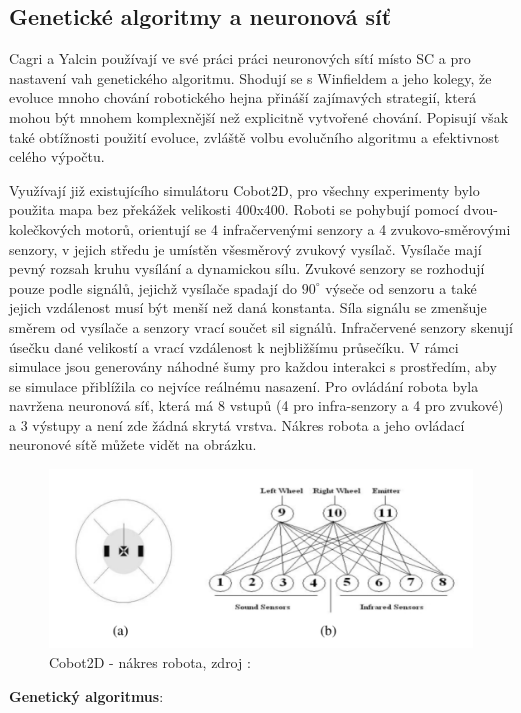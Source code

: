\subsection{Genetické algoritmy a neuronová síť}
Cagri a Yalcin používají ve své práci \citep{yalcin2008evolving} práci neuronových sítí místo SC a pro nastavení vah genetického algoritmu. Shodují se s Winfieldem a jeho kolegy, že evoluce mnoho chování robotického hejna přináší zajímavých strategií, která mohou být mnohem komplexnější než explicitně vytvořené chování. Popisují však také obtížnosti použití evoluce, zvláště volbu evolučního algoritmu a efektivnost celého výpočtu. 
\par
Využívají již existujícího simulátoru Cobot2D, pro všechny experimenty bylo použita mapa bez překážek velikosti 400x400. Roboti se pohybují pomocí dvou-kolečkových motorů, orientují se 4 infračervenými senzory a 4 zvukovo-směrovými senzory, v jejich středu je umístěn všesměrový zvukový vysílač. Vysílače mají pevný rozsah kruhu vysílání a dynamickou sílu. Zvukové senzory se rozhodují pouze podle signálů, jejichž vysílače spadají do $90^\circ$ výseče od senzoru a také jejich vzdálenost musí být menší než daná konstanta. Síla signálu se zmenšuje směrem od vysílače a senzory vrací součet sil signálů. Infračervené senzory skenují úsečku dané velikostí a vrací vzdálenost k nejbližšímu průsečíku. V rámci simulace jsou generovány náhodné šumy pro každou interakci s prostředím, aby se simulace přiblížila co nejvíce reálnému nasazení. Pro ovládání robota byla navržena neuronová síť, která má 8 vstupů (4 pro infra-senzory a 4 pro zvukové) a 3 výstupy a není zde žádná skrytá vrstva. Nákres robota a jeho ovládací neuronové sítě můžete vidět na obrázku. \par
\begin{figure}[h]\centering
\includegraphics[scale=0.5]{../img/Cobot.png}
\caption{Cobot2D - nákres robota, zdroj : \citep{yalcin2008evolving} }
\end{figure}
\newpage
\textbf{Genetický algoritmus}:
